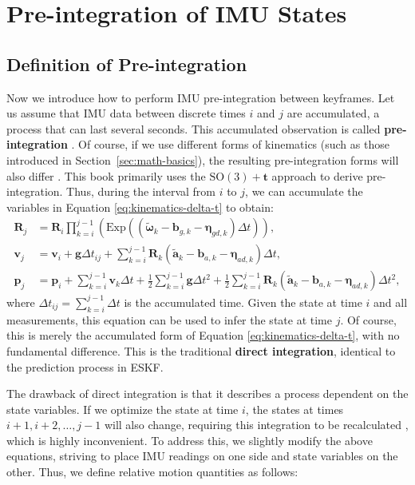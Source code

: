 \section{Pre-integration of IMU States}
\subsection{Definition of Pre-integration}
Now we introduce how to perform IMU pre-integration between keyframes. Let us assume that IMU data between discrete times $i$ and $j$ are accumulated, a process that can last several seconds. This accumulated observation is called \textbf{pre-integration} \cite{Lupton2011}. Of course, if we use different forms of kinematics (such as those introduced in Section~\ref{sec:math-basics}), the resulting pre-integration forms will also differ \cite{Qin2018}. This book primarily uses the $\mathrm{SO}(3)+\mathbf{t}$ approach to derive pre-integration. Thus, during the interval from $i$ to $j$, we can accumulate the variables in Equation \eqref{eq:kinematics-delta-t} to obtain:
\begin{subequations}
	\begin{align}
		\mathbf{R}_j &= \mathbf{R}_i \prod_{k=i}^{j-1} \left(\mathrm{Exp} \left(\left( \tilde{\boldsymbol{\omega}}_k - 
		\mathbf{b}_{g,k} - \boldsymbol{\eta}_{gd, k} \right) \Delta t \right)\right), \\
		\mathbf{v}_j &= \mathbf{v}_i + \mathbf{g} \Delta t_{ij} + \sum_{k=i}^{j-1} \mathbf{R}_k (\tilde{\mathbf{a}}_k - 
		\mathbf{b}_{a, k} - \boldsymbol{\eta}_{ad, k}) \Delta t, \\
		\mathbf{p}_j &= \mathbf{p}_i + \sum_{k=i}^{j-1} \mathbf{v}_k \Delta t + \frac{1}{2} \sum_{k=i}^{j-1} \mathbf{g} \Delta t^2 + 
		\frac{1}{2} \sum_{k=i}^{j-1} \mathbf{R}_k (\tilde{\mathbf{a}}_k - \mathbf{b}_{a,k} - \boldsymbol{\eta}_{ad, k}) 
		\Delta t^2,
	\end{align}
\end{subequations}
where $\Delta t_{ij} = \sum_{k=i}^{j-1} \Delta t$ is the accumulated time. Given the state at time $i$ and all measurements, this equation can be used to infer the state at time $j$. Of course, this is merely the accumulated form of Equation \eqref{eq:kinematics-delta-t}, with no fundamental difference. This is the traditional \textbf{direct integration}, identical to the prediction process in ESKF.

The drawback of direct integration is that it describes a process dependent on the state variables. If we optimize the state at time $i$, the states at times $i+1, i+2, \ldots, j-1$ will also change, requiring this integration to be recalculated \cite{Leutenegger2015}, which is highly inconvenient. To address this, we slightly modify the above equations, striving to place IMU readings on one side and state variables on the other. Thus, we define relative motion quantities as follows:

